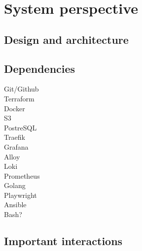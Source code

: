 \section{System perspective} \label{sp}
\subsection{Design and architecture} %


\subsection{Dependencies} %

\begin{description} 
    \item[Git/Github] 
    \item[Terraform] 
    \item[Docker] 
    \item[S3] 
    \item[PostreSQL] 
    \item[Traefik] 
    \item[Grafana] 
    \item[Alloy] 
    \item[Loki] 
    \item[Prometheus] 
    \item[Golang] 
    \item[Playwright] 
    \item[Ansible]
    \item[Bash?]
\end{description}
\subsection{Important interactions} %


